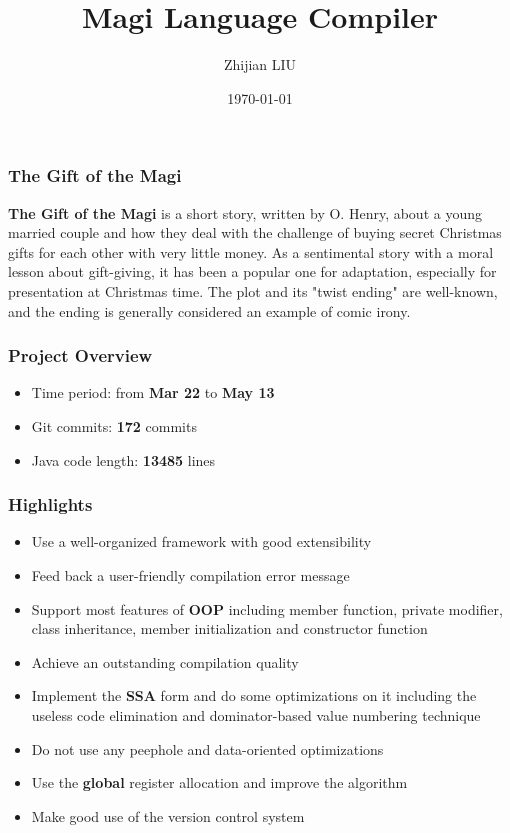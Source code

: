 \documentclass{beamer}
\begin{document}
	\begin{frame}[containsverbatim]
		\title{Magi Language Compiler}
		\author{Zhijian LIU}
		\date{\today}
		\titlepage
	\end{frame}
	
	\begin{frame}
		\frametitle{The Gift of the Magi}
		\textbf{The Gift of the Magi} is a short story, written by O. Henry, about a young married couple and how they deal with the challenge of buying secret Christmas gifts for each other with very little money. As a sentimental story with a moral lesson about gift-giving, it has been a popular one for adaptation, especially for presentation at Christmas time. The plot and its "twist ending" are well-known, and the ending is generally considered an example of comic irony.
	\end{frame}
	
	\begin{frame}
		\frametitle{Project Overview}
		\begin{itemize}
			\item Time period: from \textbf{Mar 22} to \textbf{May 13}
			\item Git commits: \textbf{172} commits
			\item Java code length: \textbf{13485} lines
		\end{itemize}
	\end{frame}
	
	\begin{frame}
		\frametitle{Highlights}
		\begin{itemize}
			\item Use a well-organized framework with good extensibility
			\item<0-0> Feed back a user-friendly compilation error message
			\item<0-0> Support most features of \textbf{OOP} including member function, private modifier, class inheritance, member initialization and constructor function
			\item<0-0> Achieve an outstanding compilation quality
			\item<0-0> Implement the \textbf{SSA} form and do some optimizations on it including the useless code elimination and dominator-based value numbering technique
			\item<0-0> Do not use any peephole and data-oriented optimizations
			\item<0-0> Use the \textbf{global} register allocation and improve the algorithm
			\item<0-0> Make good use of the version control system
		\end{itemize}
	\end{frame}
	
\end{document}
